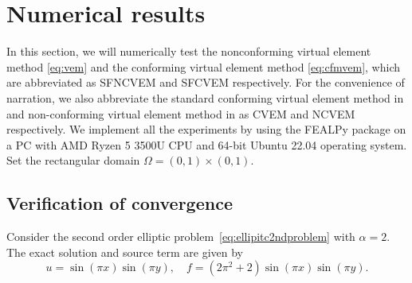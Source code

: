 \documentclass[10pt]{amsart}
\newtheorem{example}[theorem]{Example}
\numberwithin{equation}{section}
\begin{document}



\section{Numerical results}\label{sec:numericalexamps}
In this section, we will numerically test the nonconforming virtual element method \eqref{eq:vem} and the conforming
virtual element method \eqref{eq:cfmvem}, which are abbreviated as SFNCVEM and SFCVEM respectively.
For the convenience of narration, we also abbreviate the standard conforming virtual element
method in \cite{BeiraoBrezziCangianiManziniEtAl2013} and non-conforming virtual element method  in \cite{CangianiManziniSutton2017} as CVEM and NCVEM respectively. 
We implement all the experiments by using the FEALPy package \cite{fealpy} on a PC with AMD Ryzen
5 3500U CPU and 64-bit Ubuntu 22.04 operating system.
Set the rectangular domain $\Omega = (0, 1)\times(0, 1)$.


\subsection{Verification of convergence}
Consider the second order elliptic problem~\eqref{eq:ellipitc2ndproblem} with $\alpha = 2$.
The exact solution and source term are given by
\[
u = \sin(\pi x)\sin(\pi y), \quad f = (2\pi^2+2)\sin(\pi x)\sin(\pi y).
\]
\end{document}
